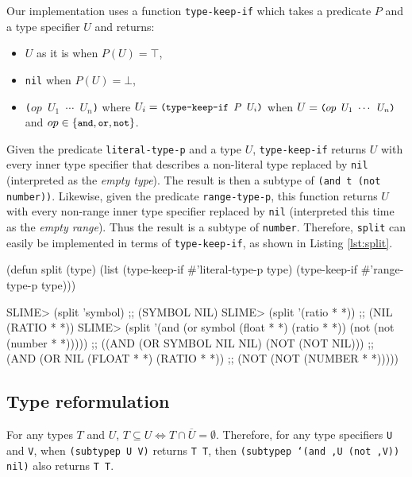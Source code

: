\documentclass[format=sigconf]{acmart}
\newcommand\code[2][\small]{\sloppy\texttt{#1#2}}
\newcommand\mcode[2][\small]{\text{\code[#1]{#2}}}
\theoremstyle{definition}
\begin{document}
Our implementation uses a function \code{type-keep-if} which takes a predicate
$P$ and a type specifier $U$ and returns:
\begin{itemize}
\item $U$ as it is when $P(U) = \top$,
\item \code{nil} when $P(U) = \bot$,
\item \code{($op$ $U_1$ $\cdots$ $U_n$)}
  where \(U_i = \mcode{(type-keep-if $P$ $U_i$)}\)
  when \(U = \mcode{($op$ $U_1$ $\cdots$ $U_n$)}\)
  and $op \in \{\mcode{and}, \mcode{or}, \mcode{not}\}$.
\end{itemize}
Given the predicate \code{literal-type-p} and a type $U$, \code{type-keep-if}
returns $U$ with every inner type specifier that describes a non-literal type
replaced by \code{nil} (interpreted as the \textit{empty type}). The result is then a
subtype of \code{(and t (not number))}.
Likewise, given the predicate \code{range-type-p}, this function returns $U$
with every non-range inner type specifier replaced by \code{nil} (interpreted
this time as the \textit{empty range}). Thus the result is a subtype of \code{number}.
Therefore, \code{split} can easily be implemented in terms of
\code{type-keep-if}, as shown in Listing \ref{lst:split}.

\begin{listing}
\begin{clcode}
(defun split (type)
  (list (type-keep-if #'literal-type-p type)
        (type-keep-if #'range-type-p type)))
\end{clcode}
\medskip
\begin{clcode}
SLIME> (split 'symbol)
;; (SYMBOL NIL)
SLIME> (split '(ratio * *))
;; (NIL (RATIO * *))
SLIME> (split  '(and (or symbol (float * *) (ratio * *))
                     (not (not (number * *)))))
;; ((AND (OR SYMBOL NIL NIL) (NOT (NOT NIL)))
;;  (AND (OR NIL (FLOAT * *) (RATIO * *))
;;       (NOT (NOT (NUMBER * *)))))
\end{clcode}
\caption{The \code{split} function}
\label{lst:split}
\end{listing}

\subsection{Type reformulation}
For any types $T$ and $U$,
\(T \subseteq U \Leftrightarrow T \cap \overline{U} = \emptyset\).
Therefore, for any type specifiers \code{U} and \code{V}, when
\code{(subtypep U V)} returns \code{T T}, then
\code{(subtypep `(and ,U (not ,V)) nil)} also returns \code{T T}.
\end{document}
